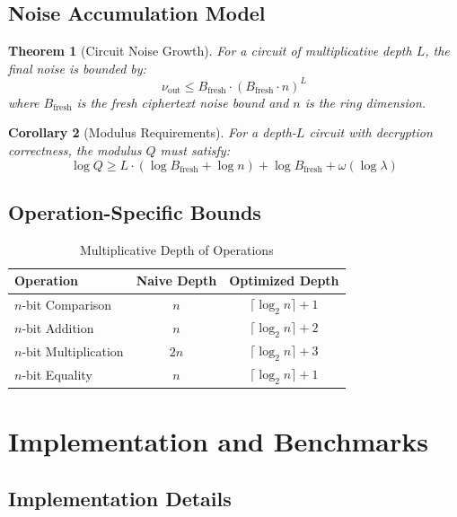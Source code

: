 \documentclass[11pt,a4paper]{article}
\newtheorem{theorem}{Theorem}[section]
\newtheorem{corollary}[theorem]{Corollary}
\begin{document}
\subsection{Noise Accumulation Model}

\begin{theorem}[Circuit Noise Growth]
For a circuit of multiplicative depth $L$, the final noise is bounded by:
\begin{equation}
\nu_{\text{out}} \leq B_{\text{fresh}} \cdot (B_{\text{fresh}} \cdot n)^L
\end{equation}
where $B_{\text{fresh}}$ is the fresh ciphertext noise bound and $n$ is the ring dimension.
\end{theorem}

\begin{corollary}[Modulus Requirements]
For a depth-$L$ circuit with decryption correctness, the modulus $Q$ must satisfy:
\begin{equation}
\log Q \geq L \cdot (\log B_{\text{fresh}} + \log n) + \log B_{\text{fresh}} + \omega(\log \lambda)
\end{equation}
\end{corollary}

\subsection{Operation-Specific Bounds}

\begin{table}[h]
\centering
\caption{Multiplicative Depth of Operations}
\begin{tabular}{@{}lcc@{}}
\toprule
Operation & Naive Depth & Optimized Depth \\
\midrule
$n$-bit Comparison & $n$ & $\lceil \log_2 n \rceil + 1$ \\
$n$-bit Addition & $n$ & $\lceil \log_2 n \rceil + 2$ \\
$n$-bit Multiplication & $2n$ & $\lceil \log_2 n \rceil + 3$ \\
$n$-bit Equality & $n$ & $\lceil \log_2 n \rceil + 1$ \\
\bottomrule
\end{tabular}
\end{table}

\section{Implementation and Benchmarks}

\subsection{Implementation Details}
\end{document}
